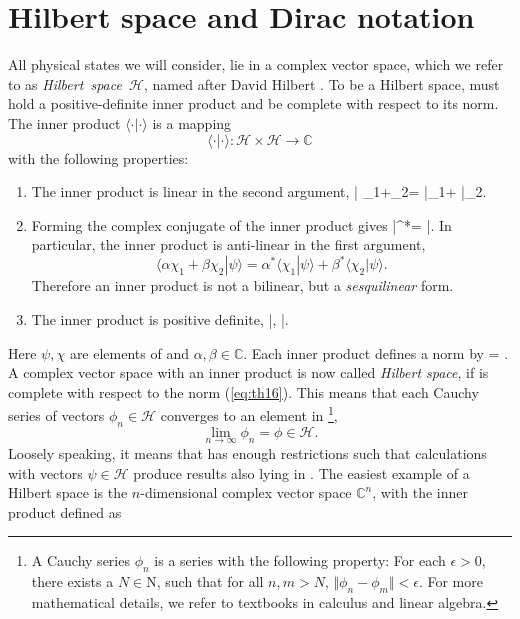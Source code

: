 \section{Hilbert space and Dirac notation}
All physical states we will consider, lie in a complex vector space, which we refer to as \mbox{\textit{Hilbert space $\mathcal{H}$}}, named after David Hilbert \cite{hilbert}. To be a Hilbert space, \hilbert must hold a positive-definite inner product and be complete with respect to its norm. The inner product $\langle\cdot|\cdot\rangle$ is a mapping
\[
\langle\cdot|\cdot\rangle: \mathcal{H}\times \mathcal{H}\rightarrow\mathbb{C}
\]
with the following properties:
\begin{enumerate}
\item The inner product is linear in the second argument,
\be 
\langle \psi| \alpha \chi_1+\beta \chi_2\rangle = \alpha \langle \psi|\chi_1\rangle + \beta\langle\psi|\chi_2\rangle.
\ee
\item Forming the complex conjugate of the inner product gives
\be 
\langle \psi|\chi \rangle^*= \langle \chi|\psi \rangle.
\ee
In particular, the inner product is anti-linear in the first argument,
\[
\langle \alpha\chi_1 + \beta\chi_2|\psi\rangle = \alpha^* \langle \chi_1|\psi\rangle + \beta^* \langle \chi_2|\psi\rangle.
\]
Therefore an inner product is not a bilinear, but a \textit{sesquilinear} form. 
\item The inner product is positive definite,
\be 
\langle\psi|\psi\rangle {}, \qquad{}\qquad \langle\psi|\psi{}\Rightarrow {}.
\ee
\end{enumerate}
Here $\psi,\chi$ are elements of \hilbert and $\alpha,\beta\in\mathbb{C}$. Each inner product defines a norm by
\be 
\Vert\psi\Vert = \sqrt{\langle\psi|\psi\rangle}.
\label{eq:th16}
\ee
A complex vector space \hilbert with an inner product is now called \textit{Hilbert space}, if \hilbert is complete with respect to the norm (\ref{eq:th16}). This means that each Cauchy series of vectors $\phi_n\in\mathcal{H}$ converges to an element in \hilbert\footnote{A Cauchy series $\phi_n$ is a series with the following property: For each $\epsilon>0$, there exists a $N\in\mathrm{N}$, such that for all $n,m>N$, $\Vert \phi_n-\phi_m\Vert<\epsilon$. For more mathematical details, we refer to textbooks in calculus and linear algebra.},
\[
\lim_{n\rightarrow\infty}\phi_n = \phi\in\mathcal{H}.
\]
 Loosely speaking, it means that \hilbert has enough restrictions such that calculations with vectors $\psi\in\mathcal{H}$ produce results also lying in \hilbert. The easiest example of a Hilbert space is the $n$-dimensional complex vector space $\mathbb{C}^n$, with the inner product defined as

